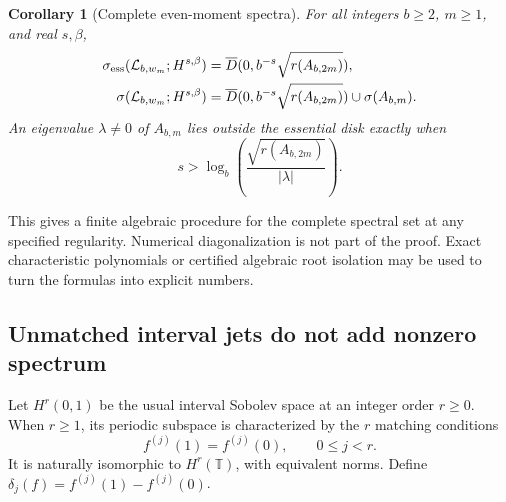 \documentclass[11pt,a4paper]{article}
\newtheorem{corollary}[theorem]{Corollary}
\theoremstyle{definition}
\theoremstyle{remark}
\newcommand{\T}{\mathbb T}
\newcommand{\Lop}{\mathcal L}
\newcommand{\ess}{\mathrm{ess}}
\newcommand{\Disk}[1]{\overline{D}(0,#1)}
\numberwithin{equation}{section}
\begin{document}
\begin{corollary}[Complete even-moment spectra]
\label{cor:all-sine}
For all integers $b\ge2$, $m\ge1$, and real $s,\beta$,
\begin{align}
 \sigma_{\ess}(\Lop_{b,w_m};H^{s,\beta})
 &=\Disk{b^{-s}\sqrt{r(A_{b,2m})}},\notag\\
 \sigma(\Lop_{b,w_m};H^{s,\beta})
 &=\Disk{b^{-s}\sqrt{r(A_{b,2m})}}\cup\sigma(A_{b,m}).
 \label{eq:all-sine-spectrum}
\end{align}
An eigenvalue $\lambda\ne0$ of $A_{b,m}$ lies outside the essential disk
exactly when
\begin{equation}
 s>\log_b\!\left(\frac{\sqrt{r(A_{b,2m})}}{|\lambda|}\right).
 \label{eq:general-isolation-threshold}
\end{equation}
\end{corollary}

This gives a finite algebraic procedure for the complete spectral set at
any specified regularity. Numerical diagonalization is not part of the
proof. Exact characteristic polynomials or certified algebraic root
isolation may be used to turn the formulas into explicit numbers.

\subsection{Unmatched interval jets do not add nonzero spectrum}
Let $H^r(0,1)$ be the usual interval Sobolev space at an integer order
$r\ge0$. When $r\ge1$, its periodic subspace is characterized by the
$r$ matching conditions
\begin{equation}
 f^{(j)}(1)=f^{(j)}(0),\qquad 0\le j<r.
 \label{eq:matching-jets}
\end{equation}
It is naturally isomorphic to $H^r(\T)$, with equivalent norms. Define
$\delta_j(f)=f^{(j)}(1)-f^{(j)}(0)$.
\end{document}
